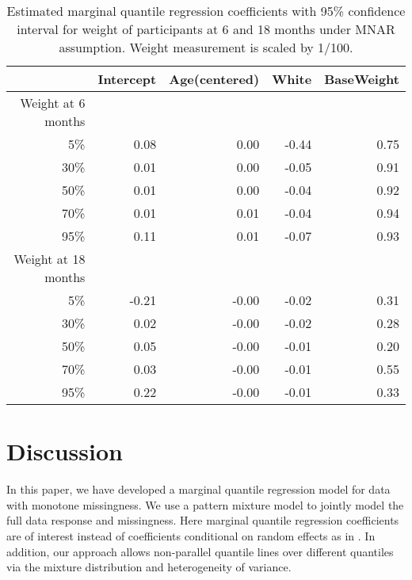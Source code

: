 \documentclass[12pt]{article}
\begin{document}
\begin{table}
  \renewcommand{\arraystretch}{1.3}
  \begin{center}
    \caption{Estimated marginal quantile regression coefficients with
      95\% confidence interval for weight of participants at 6 and 18
      months under MNAR assumption. Weight measurement is scaled by
      1/100.}\label{tab:toursmnar}
    \vspace{10pt}
    \begin{tabular}{rrrrr}
      \toprule
      & Intercept & Age(centered) & White & BaseWeight \\
      \hline
      Weight at 6 months                              \\
      5\%  & 0.08      & 0.00          & -0.44 & 0.75       \\
      30\% & 0.01      & 0.00          & -0.05 & 0.91       \\
      50\% & 0.01      & 0.00          & -0.04 & 0.92       \\
      70\% & 0.01      & 0.01          & -0.04 & 0.94       \\
      95\% & 0.11      & 0.01          & -0.07 & 0.93       \\
      Weight at 18 months                             \\
      5\%  & -0.21     & -0.00         & -0.02 & 0.31       \\
      30\% & 0.02      & -0.00         & -0.02 & 0.28       \\
      50\% & 0.05      & -0.00         & -0.01 & 0.20       \\
      70\% & 0.03      & -0.00         & -0.01 & 0.55       \\
      95\% & 0.22      & -0.00         & -0.01 & 0.33       \\
      \bottomrule
    \end{tabular}
  \end{center}
\end{table}

\section{Discussion}
\label{sec:discussion}

In this paper, we have developed a marginal quantile regression model
for data with monotone missingness. We use a pattern mixture model to
jointly model the full data response and missingness. Here marginal
quantile regression coefficients are of interest instead of
coefficients conditional on random effects as in \citet{yuan2010}. In
addition, our approach allows non-parallel quantile lines over
different quantiles via the mixture distribution and heterogeneity of
variance.
\end{document}
